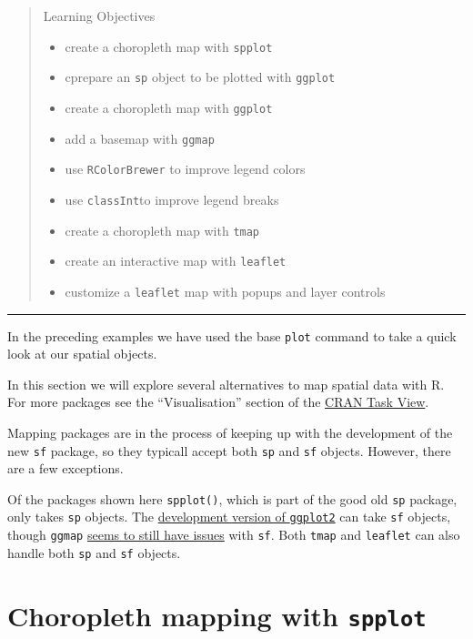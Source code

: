 \documentclass[]{book}
\providecommand{\tightlist}{%
  \setlength{\itemsep}{0pt}\setlength{\parskip}{0pt}}
\theoremstyle{definition}
\theoremstyle{definition}
\theoremstyle{definition}
\theoremstyle{remark}
\begin{document}
\begin{quote}
Learning Objectives

\begin{itemize}
\tightlist
\item
  create a choropleth map with \texttt{spplot}
\item
  cprepare an \texttt{sp} object to be plotted with \texttt{ggplot}
\item
  create a choropleth map with \texttt{ggplot}
\item
  add a basemap with \texttt{ggmap}
\item
  use \texttt{RColorBrewer} to improve legend colors
\item
  use \texttt{classInt}to improve legend breaks
\item
  create a choropleth map with \texttt{tmap}
\item
  create an interactive map with \texttt{leaflet}
\item
  customize a \texttt{leaflet} map with popups and layer controls
\end{itemize}
\end{quote}

\begin{center}\rule{0.5\linewidth}{\linethickness}\end{center}

In the preceding examples we have used the base \texttt{plot} command to
take a quick look at our spatial objects.

In this section we will explore several alternatives to map spatial data
with R. For more packages see the ``Visualisation'' section of the
\href{https://cran.r-project.org/web/views/Spatial.html}{CRAN Task
View}.

Mapping packages are in the process of keeping up with the development
of the new \texttt{sf} package, so they typicall accept both \texttt{sp}
and \texttt{sf} objects. However, there are a few exceptions.

Of the packages shown here \texttt{spplot()}, which is part of the good
old \texttt{sp} package, only takes \texttt{sp} objects. The
\href{https://github.com/tidyverse/ggplot2/releases}{development version
of \texttt{ggplot2}} can take \texttt{sf} objects, though \texttt{ggmap}
\href{https://github.com/tidyverse/ggplot2/issues/2130}{seems to still
have issues} with \texttt{sf}. Both \texttt{tmap} and \texttt{leaflet}
can also handle both \texttt{sp} and \texttt{sf} objects.

\section{\texorpdfstring{Choropleth mapping with
\texttt{spplot}}{Choropleth mapping with spplot}}\label{choropleth-mapping-with-spplot}
\end{document}
